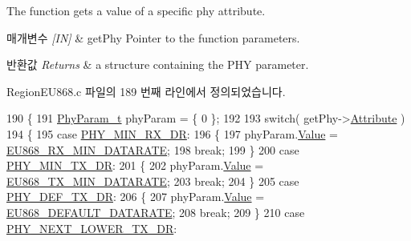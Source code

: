 The function gets a value of a specific phy attribute. 


\begin{DoxyParams}{매개변수}
{\em \mbox{[}\+I\+N\mbox{]}} & get\+Phy Pointer to the function parameters.\\
\hline
\end{DoxyParams}

\begin{DoxyRetVals}{반환값}
{\em Returns} & a structure containing the P\+HY parameter. \\
\hline
\end{DoxyRetVals}


Region\+E\+U868.\+c 파일의 189 번째 라인에서 정의되었습니다.


\begin{DoxyCode}
190 \{
191     \mbox{\hyperlink{unionu_phy_param}{PhyParam\_t}} phyParam = \{ 0 \};
192 
193     \textcolor{keywordflow}{switch}( getPhy->\mbox{\hyperlink{structs_get_phy_params_abdcb168ffd6913b85e2f635d7a475f2d}{Attribute}} )
194     \{
195         \textcolor{keywordflow}{case} \mbox{\hyperlink{group___r_e_g_i_o_n_gga51cbe8f5433d914fe9cf81b451de2c2da91cb5d84f937c32cd635dd7efe7a9d3a}{PHY\_MIN\_RX\_DR}}:
196         \{
197             phyParam.\mbox{\hyperlink{unionu_phy_param_a8e0dcce3428a8051614e852b8836d0d1}{Value}} = \mbox{\hyperlink{group___r_e_g_i_o_n_e_u868_gaa1bdf9b64650b847961424f9098278fc}{EU868\_RX\_MIN\_DATARATE}};
198             \textcolor{keywordflow}{break};
199         \}
200         \textcolor{keywordflow}{case} \mbox{\hyperlink{group___r_e_g_i_o_n_gga51cbe8f5433d914fe9cf81b451de2c2daace3e56c88b40def8ed6a9106871e7de}{PHY\_MIN\_TX\_DR}}:
201         \{
202             phyParam.\mbox{\hyperlink{unionu_phy_param_a8e0dcce3428a8051614e852b8836d0d1}{Value}} = \mbox{\hyperlink{group___r_e_g_i_o_n_e_u868_ga2df2a8fc7db7e674c3e58de0dd1c90a4}{EU868\_TX\_MIN\_DATARATE}};
203             \textcolor{keywordflow}{break};
204         \}
205         \textcolor{keywordflow}{case} \mbox{\hyperlink{group___r_e_g_i_o_n_gga51cbe8f5433d914fe9cf81b451de2c2da70c3923333165960549162e3dcf10467}{PHY\_DEF\_TX\_DR}}:
206         \{
207             phyParam.\mbox{\hyperlink{unionu_phy_param_a8e0dcce3428a8051614e852b8836d0d1}{Value}} = \mbox{\hyperlink{group___r_e_g_i_o_n_e_u868_ga4053f96ad333ad07d4584f7213e294fa}{EU868\_DEFAULT\_DATARATE}};
208             \textcolor{keywordflow}{break};
209         \}
210         \textcolor{keywordflow}{case} \mbox{\hyperlink{group___r_e_g_i_o_n_gga51cbe8f5433d914fe9cf81b451de2c2dac002e7e492cf30dbf9c544b062f5cc8a}{PHY\_NEXT\_LOWER\_TX\_DR}}:

\end{DoxyCode}
